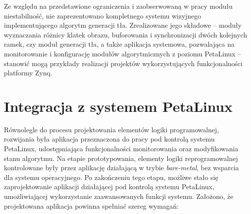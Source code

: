 Ze względu na przedstawione ograniczenia i zaobserwowaną w pracy modułu niestabilność, nie zaprezentowano kompletnego systemu wizyjnego implementującego algorytm generacji tła. Zrealizowane jego składowe -- moduły wyznaczania różnicy klatek obrazu, buforowania i synchronizacji dwóch kolejnych ramek, czy moduł generacji tła, a także aplikacja systemowa, pozwalająca na monitorowanie i konfigurację modułów algorytmicznych z poziomu PetaLinux -- stanowić mogą przykłady realizacji projektów wykorzystujących funkcjonalności platformy Zynq.

\section{Integracja z systemem PetaLinux}

Równolegle do procesu projektowania elementów logiki programowalnej, rozwijania była aplikacja przeznaczona do pracy pod kontrolą systemu PetaLinux, udostępniająca funkcjonalności monitorowania oraz modyfikowania stanu algorytmu.
Na etapie prototypowania, elementy logiki reprogramowalnej kontrolowane były przez aplikację działającą w trybie \textit{bare-metal}, bez wsparcia dla systemu operacyjnego.
Po zakończeniu tego etapu, możliwe stało się zaprojektowanie aplikacji działającej pod kontrolą systemu PetaLinux, umożliwiającej wykorzystanie zaawansowanych funkcji systemu.
Założono, że projektowana aplikacja powinna spełniać szereg wymagań:

